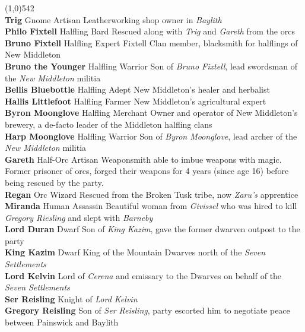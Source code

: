 \documentclass[letterpaper]{article}
\newcommand{\fullline}{\noindent\line(1,0){542} \\}
\newcommand{\person}[3]{\noindent\textbf{#1
    \ifstrequal{#2}{M}{{\color{ProcessBlue}\male}}{%
    \ifstrequal{#2}{F}{\color{VioletRed}\female}{}}}{\scriptsize #3}}
\begin{document}
 \par
\vspace{-0.75em}
\fullline
\person{Trig}{F}{Gnome Artisan} Leatherworking shop owner in \emph{Baylith} \\
\person{Philo Fixtell}{M}{Halfling Bard} Rescued along with \emph{Trig} and \emph{Gareth} from the orcs \\
\person{Bruno Fixtell}{M}{Halfling Expert} Fixtell Clan member, blacksmith for halflings of New Middleton \\
\person{Bruno the Younger}{M}{Halfling Warrior} Son of \emph{Bruno Fixtell}, lead swordsman of the \emph{New Middleton} militia \\
\person{Bellis Bluebottle}{F}{Halfling Adept} New Middleton's healer and herbalist \\
\person{Hallis Littlefoot}{F}{Halfling Farmer} New Middleton's agricultural expert \\
\person{Byron Moonglove}{M}{Halfling Merchant} Owner and operator of New Middleton's brewery, a de-facto leader of the Middleton halfling clans \\
\person{Harp Moonglove}{M}{Halfling Warrior} Son of \emph{Byron Moonglove}, lead archer of the \emph{New Middleton} militia \\
\person{Gareth}{M}{Half-Orc Artisan} Weaponsmith able to imbue weapons with magic. Former prisoner of orcs, forged their weapons for 4 years (since age 16) before being rescued by the party. \\
\person{Regan}{M}{Orc Wizard} Rescued from the Broken Tusk tribe, now \emph{Zaru's} apprentice \\
\person{Miranda}{F}{Human Assassin} Beautiful woman from \emph{Givissel} who was hired to kill \emph{Gregory Riesling} and slept with \emph{Barneby} \\
\person{Lord Duran}{M}{Dwarf} Son of \emph{King Kazim}, gave the former dwarven outpost to the party \\
\person{King Kazim}{M}{Dwarf} King of the Mountain Dwarves north of the \emph{Seven Settlements} \\
\person{Lord Kelvin}{M}{} Lord of \emph{Cerena} and emissary to the Dwarves on behalf of the \emph{Seven Settlements} \\
\person{Ser Reisling}{M}{} Knight of \emph{Lord Kelvin} \\
\person{Gregory Reisling}{M}{} Son of \emph{Ser Reisling}, party escorted him to negotiate peace between Painswick and Baylith \\
\end{document}
